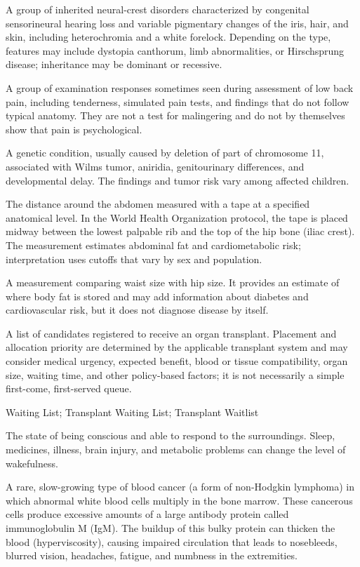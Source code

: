  A group of inherited neural-crest disorders characterized by congenital sensorineural hearing loss and variable pigmentary changes of the iris, hair, and skin, including heterochromia and a white forelock. Depending on the type, features may include dystopia canthorum, limb abnormalities, or Hirschsprung disease; inheritance may be dominant or recessive.

 A group of examination responses sometimes seen during assessment of low back pain, including tenderness, simulated pain tests, and findings that do not follow typical anatomy. They are not a test for malingering and do not by themselves show that pain is psychological.

 A genetic condition, usually caused by deletion of part of chromosome 11, associated with Wilms tumor, aniridia, genitourinary differences, and developmental delay. The findings and tumor risk vary among affected children.

 The distance around the abdomen measured with a tape at a specified anatomical level. In the World Health Organization protocol, the tape is placed midway between the lowest palpable rib and the top of the hip bone (iliac crest). The measurement estimates abdominal fat and cardiometabolic risk; interpretation uses cutoffs that vary by sex and population.

 A measurement comparing waist size with hip size. It provides an estimate of where body fat is stored and may add information about diabetes and cardiovascular risk, but it does not diagnose disease by itself.

 A list of candidates registered to receive an organ transplant. Placement and allocation priority are determined by the applicable transplant system and may consider medical urgency, expected benefit, blood or tissue compatibility, organ size, waiting time, and other policy-based factors; it is not necessarily a simple first-come, first-served queue.

\synonyms
Waiting List; Transplant Waiting List; Transplant Waitlist

 The state of being conscious and able to respond to the surroundings. Sleep, medicines, illness, brain injury, and metabolic problems can change the level of wakefulness.

 A rare, slow-growing type of blood cancer (a form of non-Hodgkin lymphoma) in which abnormal white blood cells multiply in the bone marrow. These cancerous cells produce excessive amounts of a large antibody protein called immunoglobulin M (IgM). The buildup of this bulky protein can thicken the blood (hyperviscosity), causing impaired circulation that leads to nosebleeds, blurred vision, headaches, fatigue, and numbness in the extremities.

